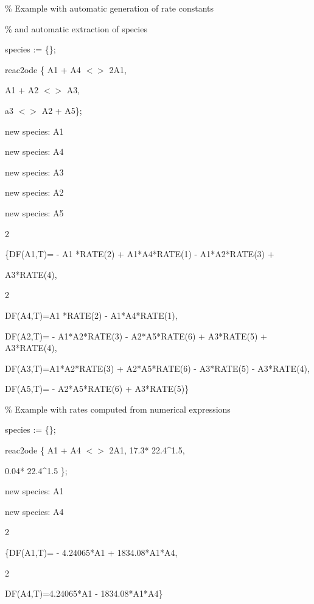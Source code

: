 \documentclass[a4paper]{article}
\begin{document}
\% Example with automatic generation of rate constants

\% and automatic extraction of species


 species := \{\};

 reac2ode \{ A1 + A4 $<>$ 2A1, 

 A1 + A2 $<>$ A3,

 a3 $<>$ A2 + A5\};


new species: A1

new species: A4

new species: A3

new species: A2

new species: A5



 2

\{DF(A1,T)= - A1 {*}RATE(2) + A1{*}A4{*}RATE(1) - A1{*}A2{*}RATE(3) + 


 A3{*}RATE(4),


 2

DF(A4,T)=A1 {*}RATE(2) - A1{*}A4{*}RATE(1),


DF(A2,T)= - A1{*}A2{*}RATE(3) - A2{*}A5{*}RATE(6) + A3{*}RATE(5) + A3{*}RATE(4),


DF(A3,T)=A1{*}A2{*}RATE(3) + A2{*}A5{*}RATE(6) - A3{*}RATE(5) - A3{*}RATE(4),


DF(A5,T)= - A2{*}A5{*}RATE(6) + A3{*}RATE(5)\}



\% Example with rates computed from numerical expressions


 species := \{\};

 reac2ode \{ A1 + A4 $<>$ 2A1, 17.3{*} 22.4\^{}1.5,

 0.04{*} 22.4\^{}1.5 \};


new species: A1

new species: A4


 2

\{DF(A1,T)= - 4.24065{*}A1 + 1834.08{*}A1{*}A4,


 2

DF(A4,T)=4.24065{*}A1 - 1834.08{*}A1{*}A4\}
\end{document}

